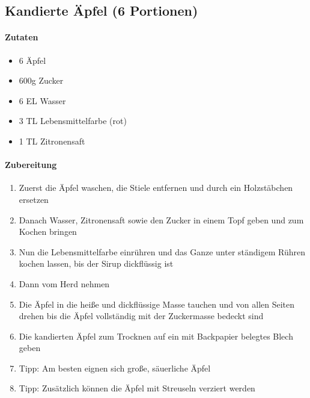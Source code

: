 \subsection{Kandierte Äpfel (6 Portionen)}
\paragraph{Zutaten}
\begin{itemize}[noitemsep]
	\item 6 Äpfel
	\item 600g Zucker
	\item 6 EL Wasser
	\item 3 TL Lebensmittelfarbe (rot)
	\item 1 TL Zitronensaft
\end{itemize}
\paragraph{Zubereitung}
\begin{enumerate}[noitemsep]
	\item Zuerst die Äpfel waschen, die Stiele entfernen und durch ein Holzstäbchen ersetzen
	\item Danach Wasser, Zitronensaft sowie den Zucker in einem Topf geben und zum Kochen bringen
	\item Nun die Lebensmittelfarbe einrühren und das Ganze unter ständigem Rühren kochen lassen, bis der Sirup dickflüssig ist
	\item Dann vom Herd nehmen
	\item Die Äpfel in die heiße und dickflüssige Masse tauchen und von allen Seiten drehen bis die Äpfel vollständig mit der Zuckermasse bedeckt sind
	\item Die kandierten Äpfel zum Trocknen auf ein mit Backpapier belegtes Blech geben
	\item Tipp: Am besten eignen sich große, säuerliche Äpfel
	\item Tipp: Zusätzlich können die Äpfel mit Streuseln verziert werden
\end{enumerate}
